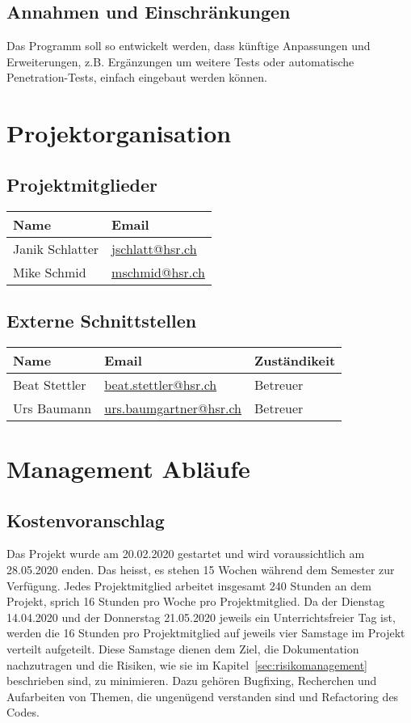 \documentclass[
	ngerman,
	toc=listof, %
	toc=bibliography, %
	footnotes=multiple, %
	parskip=half, %
	numbers=noendperiod %
]{scrartcl}
\begin{document}
	\subsection{Annahmen und Einschränkungen}
		Das Programm soll so entwickelt werden, dass künftige Anpassungen und Erweiterungen, z.B. Ergänzungen um weitere Tests oder automatische Penetration-Tests, einfach eingebaut werden können.

\section{Projektorganisation}

	\subsection{Projektmitglieder}
		\begin{tabularx}{0.9\textwidth}{lX}
			\toprule
			Name & Email \\
			\midrule
			Janik Schlatter & \url{jschlatt@hsr.ch} \\
			Mike Schmid & \url{mschmid@hsr.ch} \\
			\bottomrule
		\end{tabularx}

	\subsection{Externe Schnittstellen}
		\begin{tabularx}{0.9\textwidth}{lXl}
			\toprule
			Name & Email & Zuständikeit \\
			\midrule
			Beat Stettler & \url{beat.stettler@hsr.ch} & Betreuer \\
			Urs Baumann & \url{urs.baumgartner@hsr.ch} & Betreuer \\
			\bottomrule
		\end{tabularx}

\section{Management Abläufe}

	\subsection{Kostenvoranschlag}
		Das Projekt wurde am 20.02.2020 gestartet und wird voraussichtlich am 28.05.2020 enden.
		Das heisst, es stehen 15 Wochen während dem Semester zur Verfügung. 
		Jedes Projektmitglied arbeitet insgesamt 240 Stunden an dem Projekt, sprich 16 Stunden pro Woche pro Projektmitglied.
		Da der Dienstag 14.04.2020 und der Donnerstag 21.05.2020 jeweils ein Unterrichtsfreier Tag ist, werden die 16 Stunden pro Projektmitglied auf jeweils vier Samstage im Projekt verteilt aufgeteilt.
		Diese Samstage dienen dem Ziel, die Dokumentation nachzutragen und die Risiken, wie sie im Kapitel~\ref{sec:risikomanagement} beschrieben sind, zu minimieren. 
		Dazu gehören Bugfixing, Recherchen und Aufarbeiten von Themen, die ungenügend verstanden sind und Refactoring des Codes.
\end{document}
